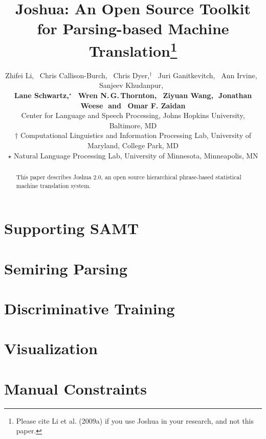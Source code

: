 \documentclass[11pt]{article}
\title{Joshua: An Open Source Toolkit for Parsing-based Machine Translation\thanks{ 
Please cite Li et al. (2009a) if you use Joshua in your research, and not this paper. }}
\author{
Zhifei Li,\,\,\,
Chris Callison-Burch,\,\,\,
Chris Dyer,$^\dagger$\,\,\,
Juri Ganitkevitch,\,\,\,
Ann Irvine,\,\,\, 
Sanjeev Khudanpur,\,\,\,\\ {\bf
Lane Schwartz,$^\star$\,\,\, 
Wren N.\,G.\,Thornton,\,\,\,
Ziyuan Wang,\,\,
Jonathan Weese\,\,
{\textnormal{and}}
\,\,\,Omar F. Zaidan}\\
Center for Language and Speech Processing, Johns Hopkins University, Baltimore, MD\\
$\dagger$ Computational Linguistics and Information Processing Lab, University of Maryland, College Park, MD\\
$\star$ Natural Language Processing Lab, University of Minnesota, Minneapolis, MN }
\date{}
\begin{document}
\maketitle

\begin{abstract}
 This paper describes Joshua 2.0, an open source hierarchical phrase-based statistical machine translation system.
\end{abstract}

\listoftodos

\section{Supporting SAMT}

\section{Semiring Parsing}

\section{Discriminative Training}

\section{Visualization}

\section{Manual Constraints}
\end{document}
